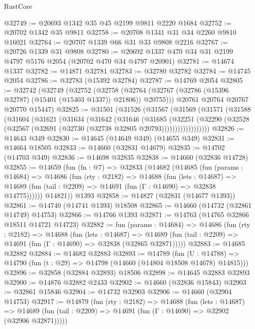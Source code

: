 \begin{lexlean}{RustCore}
\begin{coremodule}
@32749 := @20693 @1342 @35 @45 @2199 @9811 @2220 @1684
@32752 := @20702 @1342 @35 @9811
@32758 := @20708 @1341 @31 @34 @2260 @9810 @16021
@32764 := @20707 @1339 @66 @31 @33 @9808 @2216
@32767 := @20726 @1339 @31 @9808
@32780 := @20692 @1337 @470 @34 @31 @2199 @4797 @5176 @2054 (@20702 @470 @34 @4797 @20901)
@32781 := @14674 @1337
@32782 := @14871 @32781
@32783 := @32780 @32782
@32784 := @14745 @2054
@32786 := @32783 (@15392 @32784)
@32787 := @14769 @2054
@32805 := @32742
    (@32749
      (@32752
        (@32758 (@32764 (@32767 (@32786 (@15396 @32787) (@15401 (@15403 @1337)) @21806)) @20755)))
      @20761
      @20764
      @20767
      @20770
      @15447)
@32825 := @31501
    (@31526
      (@31567
        (@31569
          (@31571
            (@31588
              (@31604
                (@31621
                  (@31634
                    (@31642
                      (@31646
                        (@31685
                          (@32251
                            (@32290
                              (@32528
                                (@32567 (@32691 (@32730 (@32738 @32805 @20793))))))))))))))))))
@32826 := @14643 @349
@32830 := @14645 (@14649 @349) (@14655 @349)
@32831 := @14664 @18505
@32833 := @14660 (@32831 @14679)
@32835 := @14702 (@14703 @349)
@32836 := @14698 @32835
@32838 := @14660 (@32836 @14728)
@32855 := @14659
    (fun (fn : @7) =>
    @32833
      (@14682
        (@14685
          (fun (params : @14684) =>
          @14686
            (fun (rty : @2182) =>
            @14688
              (fun (lets : @14687) =>
              @14689 (fun (tail : @2209) => @14691 (fun (Γ : @14690) => @32838 @14775))))))
        @14821))
    @1393
@32858 := @14827 (@32831 (@14677 @1393))
@32861 := @14740 (@14741 @1393) @18508
@32865 := @14660 (@14732 (@32861 @14749) @14753)
@32866 := @14766 @1393
@32871 := @14763 (@14765 @32866 @18511 @14721 @14723)
@32882 := fun (params : @14684) =>
  @14686
    (fun (rty : @2182) =>
    @14688
      (fun (lets : @14687) =>
      @14689 (fun (tail : @2209) => @14691 (fun (Γ : @14690) => @32838 (@32865 @32871)))))
@32883 := @14685 @32882
@32884 := @14682 @32883
@32893 := @14789
    (fun (U : @14788) => @14790 (fun (t : @29) => @14798 (@14660 (@14804 @18508 @14678) @14815)))
@32896 := @32858 (@32884 @32893) @18506
@32898 := @14645 @32883 @32893
@32900 := @14876 @32882 @2433
@32902 := @14660 (@32836 @15843)
@32903 := @32861 @15846
@32904 := @14732 @32903
@32906 := @14660 (@32904 @14753)
@32917 := @14879
    (fun (rty : @2182) =>
    @14688
      (fun (lets : @14687) =>
      @14689 (fun (tail : @2209) => @14691 (fun (Γ : @14690) => @32902 (@32906 @32871)))))

\end{coremodule}
\end{lexlean}
